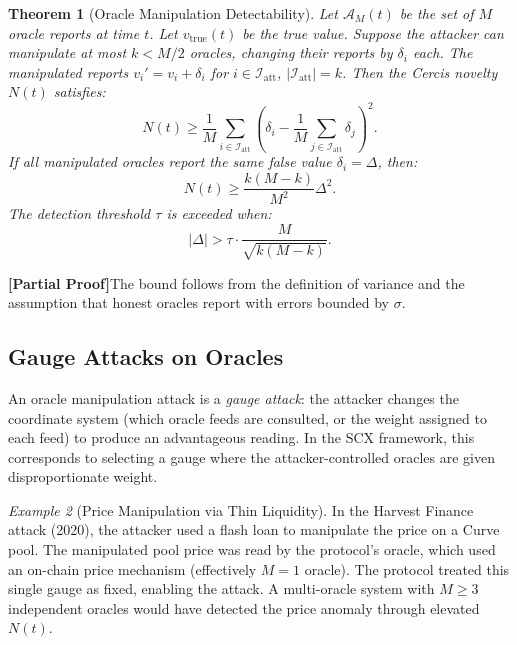 \documentclass[12pt,a4paper]{article}
\newtheorem{theorem}{Theorem}[section]
\theoremstyle{remark}
\newtheorem{example}[theorem]{Example}
\newcommand{\A}{\mathcal{A}}
\newcommand{\I}{\mathcal{I}}
\newcommand{\Cercis}{\textsf{Cercis}}
\newcommand{\rigorPartial}{\textbf{[Partial Proof]}}
\begin{document}
\begin{theorem}[Oracle Manipulation Detectability]
\label{thm:oracle_detect}
Let $\A_M(t)$ be the set of $M$ oracle reports at time $t$. Let
$v_{\text{true}}(t)$ be the true value. Suppose the attacker can manipulate at
most $k < M/2$ oracles, changing their reports by $\delta_i$ each. The
manipulated reports $v_i' = v_i + \delta_i$ for $i \in \I_{\text{att}}$,
$|\I_{\text{att}}| = k$. Then the \Cercis{} novelty $N(t)$ satisfies:
\begin{equation}
N(t) \geq \frac{1}{M} \sum_{i \in \I_{\text{att}}} \left( \delta_i -
\frac{1}{M} \sum_{j \in \I_{\text{att}}} \delta_j \right)^2.
\label{eq:oracle_n_bound}
\end{equation}
If all manipulated oracles report the same false value $\delta_i = \Delta$, then:
\begin{equation}
N(t) \geq \frac{k(M-k)}{M^2} \Delta^2.
\label{eq:oracle_n_equal}
\end{equation}
The detection threshold $\tau$ is exceeded when:
\begin{equation}
|\Delta| > \tau \cdot \frac{M}{\sqrt{k(M-k)}}.
\label{eq:oracle_threshold}
\end{equation}
\end{theorem}

\rigorPartial The bound follows from the definition of variance and the
assumption that honest oracles report with errors bounded by $\sigma$.

\subsection{Gauge Attacks on Oracles}

An oracle manipulation attack is a \emph{gauge attack}: the attacker changes
the coordinate system (which oracle feeds are consulted, or the weight assigned
to each feed) to produce an advantageous reading. In the SCX framework, this
corresponds to selecting a gauge where the attacker-controlled oracles are
given disproportionate weight.

\begin{example}[Price Manipulation via Thin Liquidity]
In the Harvest Finance attack (2020), the attacker used a flash loan to
manipulate the price on a Curve pool. The manipulated pool price was read by
the protocol's oracle, which used an on-chain price mechanism (effectively
$M=1$ oracle). The protocol treated this single gauge as fixed, enabling the
attack. A multi-oracle system with $M \geq 3$ independent oracles would have
detected the price anomaly through elevated $N(t)$.
\end{example}
\end{document}
